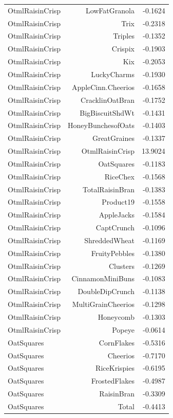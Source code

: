 \begin{longtable}{@{}lrr@{}}
OtmlRaisinCrisp & LowFatGranola & -0.1624 \\
OtmlRaisinCrisp & Trix & -0.2318 \\
OtmlRaisinCrisp & Triples & -0.1352 \\
OtmlRaisinCrisp & Crispix & -0.1903 \\
OtmlRaisinCrisp & Kix & -0.2053 \\
OtmlRaisinCrisp & LuckyCharms & -0.1930 \\
OtmlRaisinCrisp & AppleCinn.Cheerios & -0.1658 \\
OtmlRaisinCrisp & CracklinOatBran & -0.1752 \\
OtmlRaisinCrisp & BigBiscuitShdWt & -0.1431 \\
OtmlRaisinCrisp & HoneyBunchesofOats & -0.1403 \\
OtmlRaisinCrisp & GreatGraines & -0.1337 \\
OtmlRaisinCrisp & OtmlRaisinCrisp & 13.9024 \\
OtmlRaisinCrisp & OatSquares & -0.1183 \\
OtmlRaisinCrisp & RiceChex & -0.1568 \\
OtmlRaisinCrisp & TotalRaisinBran & -0.1383 \\
OtmlRaisinCrisp & Product19 & -0.1558 \\
OtmlRaisinCrisp & AppleJacks & -0.1584 \\
OtmlRaisinCrisp & CaptCrunch & -0.1096 \\
OtmlRaisinCrisp & ShreddedWheat & -0.1169 \\
OtmlRaisinCrisp & FruityPebbles & -0.1380 \\
OtmlRaisinCrisp & Clusters & -0.1269 \\
OtmlRaisinCrisp & CinnamonMiniBuns & -0.1083 \\
OtmlRaisinCrisp & DoubleDipCrunch & -0.1138 \\
OtmlRaisinCrisp & MultiGrainCheerios & -0.1298 \\
OtmlRaisinCrisp & Honeycomb & -0.1303 \\
OtmlRaisinCrisp & Popeye & -0.0614 \\
OatSquares & CornFlakes & -0.5316 \\
OatSquares & Cheerios & -0.7170 \\
OatSquares & RiceKrispies & -0.6195 \\
OatSquares & FrostedFlakes & -0.4987 \\
OatSquares & RaisinBran & -0.3309 \\
OatSquares & Total & -0.4413 \\

\end{longtable}
